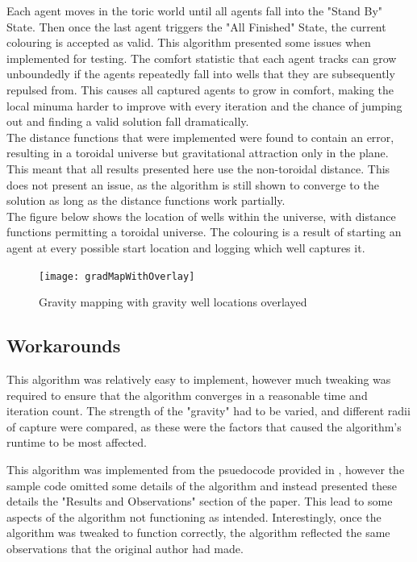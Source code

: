Each agent moves in the toric world until all agents fall into the "Stand By" State. Then once the last agent triggers the "All Finished" State, the current colouring is accepted as valid. This algorithm presented some issues when implemented for testing. The comfort statistic that each agent tracks can grow unboundedly if the agents repeatedly fall into wells that they are subsequently repulsed from. This causes all captured agents to grow in comfort, making the local minuma harder to improve with every iteration and the chance of jumping out and finding a valid solution fall dramatically. 
\\The distance functions that were implemented were found to contain an error, resulting in a toroidal universe but gravitational attraction only in the plane. This meant that all results presented here use the non-toroidal distance. This does not present an issue, as the algorithm is still shown to converge to the solution as long as the distance functions work partially.
\\The figure below shows the location of wells within the universe, with distance functions permitting a toroidal universe. The colouring is a result of starting an agent at every possible start location and logging which well captures it. 
\begin{figure}[H]
\caption{Gravity mapping with gravity well locations overlayed}
\centering
\texttt{[image: gradMapWithOverlay]}
\end{figure}

\subsection{Workarounds}
This algorithm was relatively easy to implement, however much tweaking was required to ensure that the algorithm converges in a reasonable time and iteration count. The strength of the "gravity" had to be varied, and different radii of capture were compared, as these were the factors that caused the algorithm's runtime to be most affected. 

This algorithm was implemented from the psuedocode provided in \cite{bib:GravSwarm}, however the sample code omitted some details of the algorithm and instead presented these details the "Results and Observations" section of the paper. This lead to some aspects of the algorithm not functioning as intended. Interestingly, once the algorithm was tweaked to function correctly, the algorithm reflected the same observations that the original author had made. 

